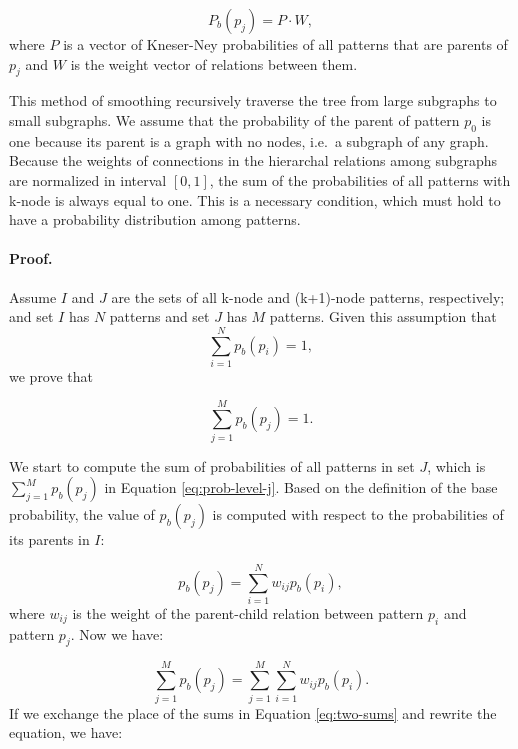 \begin{equation}
P_b(p_j)  = P \cdot W,
\end{equation}
%
where $P$ is a vector of \mbox{Kneser-Ney} probabilities of all patterns that are parents of $p_j$ and $W$ is the weight vector of relations between them. 

This method of smoothing recursively traverse the tree from large subgraphs to small subgraphs. 
We assume that the probability of the parent of pattern $p_0$ is one because its parent is a graph with no nodes, i.e.\ a subgraph of any graph.
Because the weights of connections in the hierarchal relations among subgraphs are normalized in interval $[0,1]$, the
sum of the probabilities of all patterns with k-node is always
equal to one. 
This is a necessary condition, which must hold to have a probability distribution among patterns.  

\paragraph{Proof.} 
Assume $I$ and $J$ are the sets of all k-node and (k+1)-node
patterns, respectively; and set $I$ has $N$ patterns and set $J$ has $M$ patterns. 
Given this assumption that 
\begin{equation}
\sum_{i=1}^N p_b(p_i)=1,
\end{equation}
%
we prove that  

\begin{equation}
  \label{eq:prob-level-j}
  \sum_{j=1}^M p_b(p_j)=1. 
\end{equation}

We start to compute the sum of probabilities of all patterns in set $J$, which is $\sum_{j=1}^M p_b(p_j)$ in Equation \ref{eq:prob-level-j}.
Based on the definition of the base probability, the value of
$p_b(p_j)$ is computed with respect to the probabilities of its parents in $I$:

\begin{equation}
  p_b(p_j)=\sum_{i=1}^N w_{ij}p_b(p_i),
\end{equation}
where $w_{ij}$ is the weight of the \mbox{parent-child} relation between pattern $p_i$ and pattern $p_j$. 
Now we have:

\begin{equation}
\label{eq:two-sums}
\sum_{j=1}^M p_b(p_j) = \sum_{j=1}^M\sum_{i=1}^N w_{ij}p_b(p_i).
\end{equation}
%
If we exchange the place of the sums in Equation \ref{eq:two-sums} and rewrite the equation, we have: 

